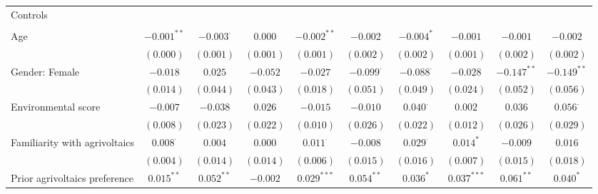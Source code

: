 \begin{center}
\begin{small}
\begin{longtable}{l@{} c@{} c@{} c@{} c@{} c@{} c@{} c@{} c@{} c@{}}
Controls                            &                 &                  &              &                 &                  &                  &                 &                 &                 \\
                                    &                 &                  &              &                 &                  &                  &                 &                 &                 \\
\quad Age                           & $-0.001^{**}$   & $-0.003^{\cdot}$ & $0.000$      & $-0.002^{**}$   & $-0.002$         & $-0.004^{*}$     & $-0.001$        & $-0.001$        & $-0.002$        \\
                                    & $(0.000)$       & $(0.001)$        & $(0.001)$    & $(0.001)$       & $(0.002)$        & $(0.002)$        & $(0.001)$       & $(0.002)$       & $(0.002)$       \\
\quad Gender: Female                & $-0.018$        & $0.025$          & $-0.052$     & $-0.027$        & $-0.099^{\cdot}$ & $-0.088^{\cdot}$ & $-0.028$        & $-0.147^{**}$   & $-0.149^{**}$   \\
                                    & $(0.014)$       & $(0.044)$        & $(0.043)$    & $(0.018)$       & $(0.051)$        & $(0.049)$        & $(0.024)$       & $(0.052)$       & $(0.056)$       \\
\quad Environmental score           & $-0.007$        & $-0.038$         & $0.026$      & $-0.015$        & $-0.010$         & $0.040^{\cdot}$  & $0.002$         & $0.036$         & $0.056^{\cdot}$ \\
                                    & $(0.008)$       & $(0.023)$        & $(0.022)$    & $(0.010)$       & $(0.026)$        & $(0.022)$        & $(0.012)$       & $(0.026)$       & $(0.029)$       \\
\quad Familiarity with agrivoltaics & $0.008^{\cdot}$ & $0.004$          & $0.000$      & $0.011^{\cdot}$ & $-0.008$         & $0.029^{\cdot}$  & $0.014^{*}$     & $-0.009$        & $0.016$         \\
                                    & $(0.004)$       & $(0.014)$        & $(0.014)$    & $(0.006)$       & $(0.015)$        & $(0.016)$        & $(0.007)$       & $(0.015)$       & $(0.018)$       \\
\quad Prior agrivoltaics preference & $0.015^{**}$    & $0.052^{**}$     & $-0.002$     & $0.029^{***}$   & $0.054^{**}$     & $0.036^{*}$      & $0.037^{***}$   & $0.061^{**}$    & $0.040^{*}$     \\

\end{longtable}
\end{small}
\end{center}
